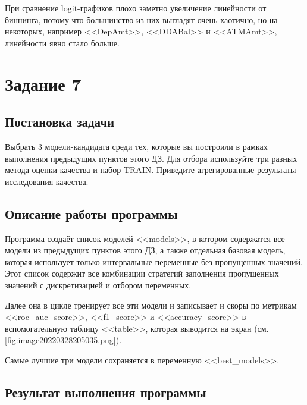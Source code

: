 \documentclass[12pt,a4paper]{article}
\begin{document}
  При сравнение logit-графиков плохо заметно увеличение линейности от биннинга,
  потому что большинство из них выгладят очень хаотично,
  но на некоторых, например <<DepAmt>>, <<DDABal>> и <<ATMAmt>>, линейности явно стало больше.

  \newpage
  \section{Задание 7}
  \subsection{Постановка задачи}
  Выбрать 3 модели-кандидата среди тех, которые вы построили в рамках
  выполнения предыдущих пунктов этого ДЗ. Для отбора используйте три
  разных метода оценки качества и набор TRAIN. Приведите агрегированные
  результаты исследования качества.

  \subsection{Описание работы программы}
  Программа создаёт список моделей <<models>>,
  в котором содержатся все модели из предыдущих пунктов этого ДЗ,
  а также отдельная базовая модель, которая использует только интервальные переменные без пропущенных значений.
  Этот список содержит все комбинации стратегий заполнения пропущенных значений с дискретизацией и отбором переменных.

  Далее она в цикле тренирует все эти модели и записывает и скоры по метрикам
  <<roc\_auc\_score>>, <<f1\_score>> и <<accuracy\_score>>
  в вспомогательную таблицу <<table>>, которая выводится на экран (см. \autoref{fig:image20220328205035.png}).

  Самые лучшие три модели сохраняется в переменную <<best\_models>>.

  \subsection{Результат выполнения программы}
\end{document}
